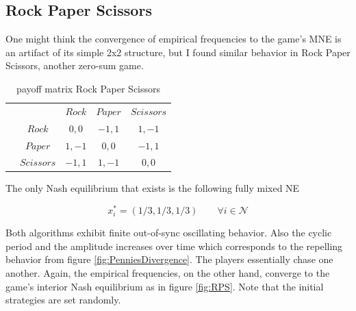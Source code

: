 \subsection{Rock Paper Scissors}\label{subsection:rockPaperScissors}

One might think the convergence of empirical frequencies to the game's MNE is an artifact of its simple 2x2 structure, but I found similar behavior in Rock Paper Scissors, another zero-sum game.

\begin{table}[H]\centering
\setlength{\extrarowheight}{2pt}
\begin{tabular}{cc|c|c|c|}
  & \multicolumn{1}{c}{} & \multicolumn{1}{c}{$Rock$}  & \multicolumn{1}{c}{$Paper$}  & \multicolumn{1}{c}{$Scissors$} \\\cline{3-5}
            & $Rock$ & $0,0$ & $-1,1$ & $1,-1$ \\ \cline{3-5}
            & $Paper$ & $1,-1$ & $0,0$ & $-1,1$ \\\cline{3-5}
            & $Scissors$ & $-1,1$ & $1,-1$ & $0,0$ \\\cline{3-5}
\end{tabular}\caption{\label{tab:payoffRPS}payoff matrix Rock Paper Scissors}
\end{table}

The only Nash equilibrium that exists is the following fully mixed NE

\begin{equation*}
    x_{i}^{*} = (1/3,1/3,1/3) \qquad \forall i \in \mathcal{N}
\end{equation*}

Both algorithms exhibit finite out-of-sync oscillating behavior. Also the cyclic period and the amplitude increases over time which corresponds to the repelling behavior from figure \ref{fig:PenniesDivergence}. The players essentially chase one another. Again, the empirical frequencies, on the other hand, converge to the game's interior Nash equilibrium as in figure \ref{fig:RPS}. Note that the initial strategies are set randomly.

